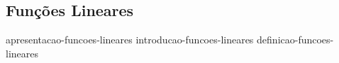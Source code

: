 \subsection{Funções Lineares}
\label{sec:funcoes-lineares}

{apresentacao-funcoes-lineares}
{introducao-funcoes-lineares}
{definicao-funcoes-lineares}